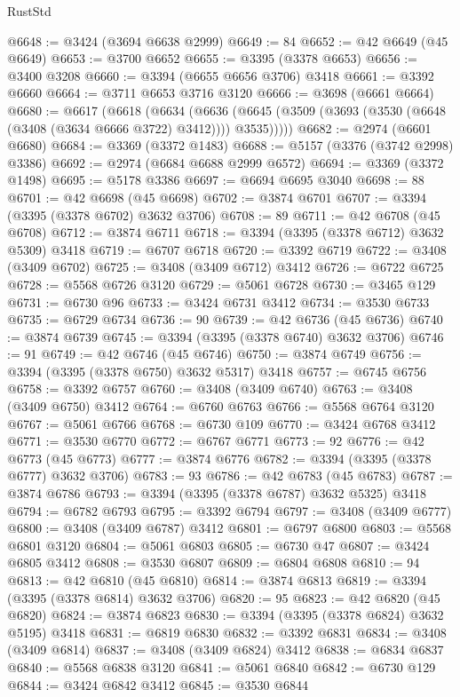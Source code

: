 \begin{lexlean}{RustStd}
\begin{coremodule}
@6648 := @3424 (@3694 @6638 @2999)
@6649 := 84
@6652 := @42 @6649 (@45 @6649)
@6653 := @3700 @6652
@6655 := @3395 (@3378 @6653)
@6656 := @3400 @3208
@6660 := @3394 (@6655 @6656 @3706) @3418
@6661 := @3392 @6660
@6664 := @3711 @6653 @3716 @3120
@6666 := @3698 (@6661 @6664)
@6680 := @6617
    (@6618
      (@6634
        (@6636 (@6645 (@3509 (@3693 (@3530 (@6648 (@3408 (@3634 @6666 @3722) @3412)))) @3535)))))
@6682 := @2974 (@6601 @6680)
@6684 := @3369 (@3372 @1483)
@6688 := @5157 (@3376 (@3742 @2998) @3386)
@6692 := @2974 (@6684 @6688 @2999 @6572)
@6694 := @3369 (@3372 @1498)
@6695 := @5178 @3386
@6697 := @6694 @6695 @3040
@6698 := 88
@6701 := @42 @6698 (@45 @6698)
@6702 := @3874 @6701
@6707 := @3394 (@3395 (@3378 @6702) @3632 @3706)
@6708 := 89
@6711 := @42 @6708 (@45 @6708)
@6712 := @3874 @6711
@6718 := @3394 (@3395 (@3378 @6712) @3632 @5309) @3418
@6719 := @6707 @6718
@6720 := @3392 @6719
@6722 := @3408 (@3409 @6702)
@6725 := @3408 (@3409 @6712) @3412
@6726 := @6722 @6725
@6728 := @5568 @6726 @3120
@6729 := @5061 @6728
@6730 := @3465 @129
@6731 := @6730 @96
@6733 := @3424 @6731 @3412
@6734 := @3530 @6733
@6735 := @6729 @6734
@6736 := 90
@6739 := @42 @6736 (@45 @6736)
@6740 := @3874 @6739
@6745 := @3394 (@3395 (@3378 @6740) @3632 @3706)
@6746 := 91
@6749 := @42 @6746 (@45 @6746)
@6750 := @3874 @6749
@6756 := @3394 (@3395 (@3378 @6750) @3632 @5317) @3418
@6757 := @6745 @6756
@6758 := @3392 @6757
@6760 := @3408 (@3409 @6740)
@6763 := @3408 (@3409 @6750) @3412
@6764 := @6760 @6763
@6766 := @5568 @6764 @3120
@6767 := @5061 @6766
@6768 := @6730 @109
@6770 := @3424 @6768 @3412
@6771 := @3530 @6770
@6772 := @6767 @6771
@6773 := 92
@6776 := @42 @6773 (@45 @6773)
@6777 := @3874 @6776
@6782 := @3394 (@3395 (@3378 @6777) @3632 @3706)
@6783 := 93
@6786 := @42 @6783 (@45 @6783)
@6787 := @3874 @6786
@6793 := @3394 (@3395 (@3378 @6787) @3632 @5325) @3418
@6794 := @6782 @6793
@6795 := @3392 @6794
@6797 := @3408 (@3409 @6777)
@6800 := @3408 (@3409 @6787) @3412
@6801 := @6797 @6800
@6803 := @5568 @6801 @3120
@6804 := @5061 @6803
@6805 := @6730 @47
@6807 := @3424 @6805 @3412
@6808 := @3530 @6807
@6809 := @6804 @6808
@6810 := 94
@6813 := @42 @6810 (@45 @6810)
@6814 := @3874 @6813
@6819 := @3394 (@3395 (@3378 @6814) @3632 @3706)
@6820 := 95
@6823 := @42 @6820 (@45 @6820)
@6824 := @3874 @6823
@6830 := @3394 (@3395 (@3378 @6824) @3632 @5195) @3418
@6831 := @6819 @6830
@6832 := @3392 @6831
@6834 := @3408 (@3409 @6814)
@6837 := @3408 (@3409 @6824) @3412
@6838 := @6834 @6837
@6840 := @5568 @6838 @3120
@6841 := @5061 @6840
@6842 := @6730 @129
@6844 := @3424 @6842 @3412
@6845 := @3530 @6844

\end{coremodule}
\end{lexlean}
